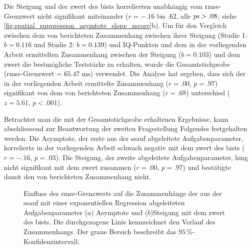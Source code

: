 \documentclass[11pt, twoside, a4paper]{book}		%
\begin{document}
Die Steigung und der \gls{zwert} des \gls{bist}s korrelierten unabhängig vom \gls{rmse}-Grenzwert nicht signifikant miteinander ($r=-.16$ bis $.62$, alle $p\textnormal{s}>.08$; siehe \autoref{fig:spatial_suppression_asymtote_slope_zscore}b). 
Um für den Vergleich zwischen dem von \citet{Melnick2013} berichteten Zusammenhang zwischen ihrer Steigung (Studie 1: $b=0.116$ und Studie 2: $b=0.139$) und IQ-Punkten und dem in der vorliegenden Arbeit ermittelten Zusammenhang zwischen der Steigung ($b=0.103$) und dem \gls{zwert} die bestmögliche Teststärke zu erhalten, wurde die Gesamtstichprobe (\gls{rmse}-Grenzwert = $65.47$ ms) verwendet. Die Analyse hat ergeben, dass sich der in der vorliegenden Arbeit ermittelte Zusammenhang ($r=.00$, $p=.97$) signifikant von dem von \citeauthor{Melnick2013} berichteten Zusammenhang ($r=.68$) unterschied ($z=5.61$, $p<.001$).

Betrachtet man die mit der Gesamtstichprobe erhaltenen Ergebnisse, kann abschliessend zur Beantwortung der zweiten Fragestellung Folgendes festgehalten werden:  
Die Asymptote, der erste aus der \gls{ssauf} abgeleitete Aufgabenparameter, korrelierte in der vorliegenden Arbeit schwach negativ mit dem \gls{zwert} des \gls{bist}s ($r=-.16$, $p=.03$). Die Steigung, der zweite abgeleitete Aufgabenparameter, hing nicht signifikant mit dem \gls{zwert} zusammen ($r=.00$, $p=.97$) und bestätigte damit den von \citet{Melnick2013} berichteten Zusammenhang nicht. 

\begin{figure}[htbp]
	\centering
	\begin{adjustbox}{width=1\textwidth}
	\end{adjustbox}
	\newline
	\begin{adjustbox}{width=1\textwidth}
	\end{adjustbox}
	
	\caption[Einfluss des \gls{rmse}-Grenzwerts der \gls{ssauf} auf den Zusammenhang zwischen der Asymptote, der Steigung und dem \gls{zwert} des \gls{bist}s]{Einfluss des \gls{rmse}-Grenzwerts auf die Zusammenhänge der aus der \gls{ssauf} mit einer exponentiellen Regression abgeleiteten Aufgabenparameter ($a$) Asymptote  und ($b$)Steigung  mit dem \gls{zwert} des \gls{bist}s. Die durchgezogene Linie kennzeichnet den Verlauf des Zusammenhangs. Der graue Bereich beschreibt das $95\,\%$-Konfidenzintervall.}
	\label{fig:spatial_suppression_asymtote_slope_zscore}
\end{figure}
\end{document}
